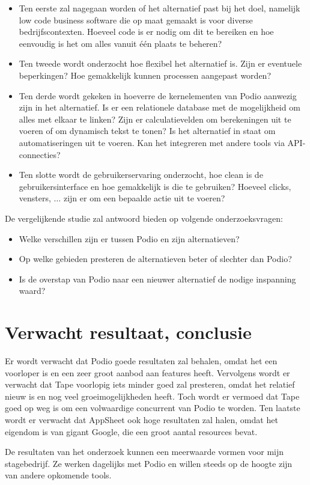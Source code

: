 \begin{itemize}
    \item Ten eerste zal nagegaan worden of het alternatief past bij het doel, namelijk low code business software die op maat gemaakt is voor diverse bedrijfscontexten. Hoeveel code is er nodig om dit te bereiken en hoe eenvoudig is het om alles vanuit één plaats te beheren?
    \item Ten tweede wordt onderzocht hoe flexibel het alternatief is. Zijn er eventuele beperkingen? Hoe gemakkelijk kunnen processen aangepast worden?
    \item Ten derde wordt gekeken in hoeverre de kernelementen van Podio aanwezig zijn in het alternatief. Is er een relationele database met de mogelijkheid om alles met elkaar te linken?  Zijn er calculatievelden om berekeningen uit te voeren of om dynamisch tekst te tonen? Is het alternatief in staat om automatiseringen uit te voeren. Kan het integreren met andere tools via API-connecties?
    \item Ten slotte wordt de gebruikerservaring onderzocht, hoe clean is de gebruikersinterface en hoe gemakkelijk is die te gebruiken? Hoeveel clicks, vensters, $\ldots$ zijn er om een bepaalde actie uit te voeren?
\end{itemize}

De vergelijkende studie zal antwoord bieden op volgende onderzoeksvragen:

\begin{itemize}
    \item Welke verschillen zijn er tussen Podio en zijn alternatieven?
    \item Op welke gebieden presteren de alternatieven beter of slechter dan Podio?
    \item Is de overstap van Podio naar een nieuwer alternatief de nodige inspanning waard?
\end{itemize}

\section{Verwacht resultaat, conclusie}%
\label{sec:verwachte_resultaten}

Er wordt verwacht dat Podio goede resultaten zal behalen, omdat het een voorloper is en een zeer groot aanbod aan features heeft. Vervolgens wordt er verwacht dat Tape voorlopig iets minder goed zal presteren, omdat het relatief nieuw is en nog veel groeimogelijkheden heeft. Toch wordt er vermoed dat Tape goed op weg is om een volwaardige concurrent van Podio te worden. Ten laatste wordt er verwacht dat AppSheet ook hoge resultaten zal halen, omdat het eigendom is van gigant Google, die een groot aantal resources bevat.

De resultaten van het onderzoek kunnen een meerwaarde vormen voor mijn stagebedrijf. Ze werken dagelijks met Podio en willen steeds op de hoogte zijn van andere opkomende tools.


